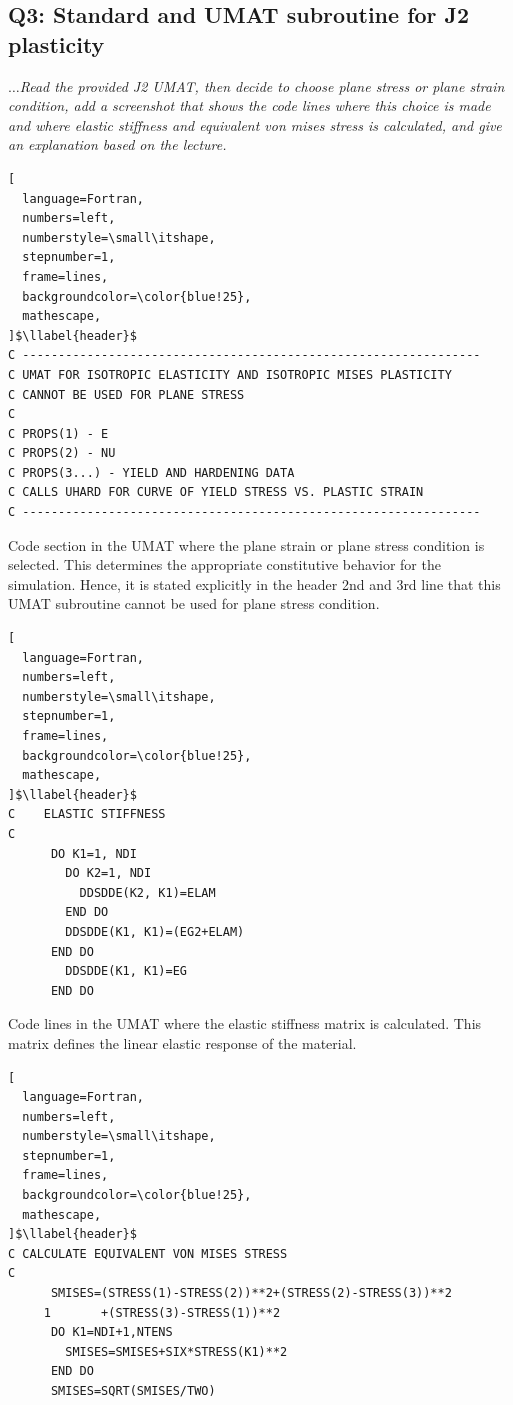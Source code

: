 \documentclass[12pt]{article}
\makeatletter
\newcounter{llabel}[lstlisting]%
\renewcommand*{\thellabel}{%
    \ifnum\value{llabel}<0 %
      \@ctrerr
    \else
      \ifnum\value{llabel}>10 %
        \@ctrerr
      \else
        \protect\ding{\the\numexpr\value{llabel}+201\relax}%
      \fi
    \fi
  }%
\newlength{\llabelsep}
\newcommand*{\llabel}[1]{%
  \begingroup
    \refstepcounter{llabel}%
    \label{#1}%
    \llap{%
      \thellabel\kern\llabelsep
      \hphantom{\lst@numberstyle\the\lst@lineno}%
      \kern\lst@numbersep
    }%
  \endgroup
}
\makeatother
\begin{document}
\subsection*{Q3: Standard and UMAT subroutine for J2 plasticity}
\vspace{1em}
\textit{$\dots$Read the provided J2 UMAT, then decide to choose plane stress or plane strain condition, add
a screenshot that shows the code lines where this choice is made and where elastic stiffness
and equivalent von mises stress is calculated, and give an explanation based on the lecture.}
\vspace{1em}
\begin{lstlisting}[
  language=Fortran,
  numbers=left,
  numberstyle=\small\itshape,
  stepnumber=1,
  frame=lines,
  backgroundcolor=\color{blue!25},
  mathescape,
]$\llabel{header}$
C ----------------------------------------------------------------
C UMAT FOR ISOTROPIC ELASTICITY AND ISOTROPIC MISES PLASTICITY
C CANNOT BE USED FOR PLANE STRESS
C 
C PROPS(1) - E
C PROPS(2) - NU
C PROPS(3...) - YIELD AND HARDENING DATA
C CALLS UHARD FOR CURVE OF YIELD STRESS VS. PLASTIC STRAIN
C ----------------------------------------------------------------
\end{lstlisting}
\vspace{1em}
Code section in the UMAT where the plane strain or plane stress condition is selected. 
This determines the appropriate constitutive behavior for the simulation. Hence, it is stated explicitly
in the header 2nd and 3rd line that this UMAT subroutine cannot be used for plane stress condition.
\vspace{1em}
\begin{lstlisting}[
  language=Fortran,
  numbers=left,
  numberstyle=\small\itshape,
  stepnumber=1,
  frame=lines,
  backgroundcolor=\color{blue!25},
  mathescape,
]$\llabel{header}$
C    ELASTIC STIFFNESS
C
      DO K1=1, NDI                       
        DO K2=1, NDI                      
          DDSDDE(K2, K1)=ELAM            
        END DO                           
        DDSDDE(K1, K1)=(EG2+ELAM)        
      END DO                             
        DDSDDE(K1, K1)=EG
      END DO      
\end{lstlisting}
\vspace{1em}
Code lines in the UMAT where the elastic stiffness matrix is calculated. 
This matrix defines the linear elastic response of the material.
\begin{lstlisting}[
  language=Fortran,
  numbers=left,
  numberstyle=\small\itshape,
  stepnumber=1,
  frame=lines,
  backgroundcolor=\color{blue!25},
  mathescape,
]$\llabel{header}$
C CALCULATE EQUIVALENT VON MISES STRESS
C
      SMISES=(STRESS(1)-STRESS(2))**2+(STRESS(2)-STRESS(3))**2
     1       +(STRESS(3)-STRESS(1))**2                   
      DO K1=NDI+1,NTENS                      
        SMISES=SMISES+SIX*STRESS(K1)**2      
      END DO
      SMISES=SQRT(SMISES/TWO)     
\end{lstlisting}
\end{document}
